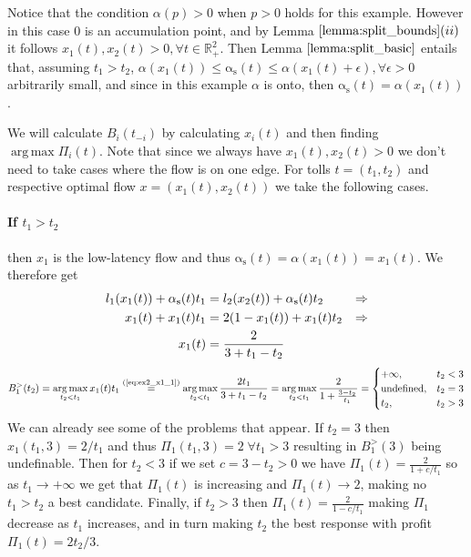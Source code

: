 \documentclass[10pt,a4paper]{book}
\newcommand{\indeq}[1]{\stackrel{\text{#1}}{=}}
\newcommand{\as}{\mathrm{\alpha_s}}
\newcommand{\R}{\mathbb{R}}
\DeclareMathOperator*{\argmax}{arg\,max}
\theoremstyle{definition}
\theoremstyle{comment}
\begin{document}
Notice that the condition $\alpha(p) > 0$ when $p > 0$ holds for this example.
However in this case $0$ is an accumulation point, and by Lemma $\ref{lemma:split_bounds}(ii)$ it follows $x_1(t), x_2(t) > 0, \forall t \in \R_+^2$.
Then Lemma $\ref{lemma:split_basic}$ entails that, assuming $t_1 > t_2$, $\alpha(x_1(t)) \le \as(t) \le \alpha(x_1(t) + \epsilon), \forall \epsilon > 0$ arbitrarily small, and since in this example $\alpha$ is onto, then $\as(t) = \alpha(x_1(t))$.

We will calculate $B_i(t_{-i})$ by calculating $x_i(t)$ and then finding $\argmax \Pi_i(t)$.
Note that since we always have $x_1(t), x_2(t) > 0$ we don't need to take cases where the flow is on one edge.
For tolls $t = (t_1, t_2)$ and respective optimal flow $x = (x_1(t), x_2(t))$ we take the following cases.

\paragraph{If $t_1 > t_2$}
then $x_1$ is the low-latency flow and thus $\as(t) = \alpha(x_1(t)) = x_1(t)$.
We therefore get
\begin{align}
	l_1(x_1(t)) + \as(t) t_1 &= l_2(x_2(t)) + \as(t) t_2 &\Rightarrow \notag \\
	x_1(t) + x_1(t) t_1 &= 2 (1 - x_1(t)) + x_1(t) t_2 &\Rightarrow \notag \\
	x_1(t) &= \frac{2}{3 + t_1 - t_2} \label{eq:ex2_x1_1}
\end{align}
\[
	B_1^>(t_2) = \argmax_{t_2 < t_1} x_1(t) t_1 \indeq{(\ref{eq:ex2_x1_1})} \argmax_{t_2 < t_1} \frac{2 t_1}{3 + t_1 - t_2} = \argmax_{t_2 < t_1} \frac{2}{1 + \frac{3 - t_2}{t_1}} =
		\begin{cases}
			+\infty, & t_2 < 3 \\
			\textrm{undefined}, & t_2 = 3 \\
			t_2, & t_2 > 3 \\
		\end{cases}
\]
We can already see some of the problems that appear.
If $t_2 = 3$ then $x_1(t_1, 3) = 2/t_1$ and thus $\Pi_1(t_1, 3) = 2 \; \forall t_1 > 3$ resulting in $B_1^>(3)$ being undefinable.
Then for $t_2 < 3$ if we set $c = 3 - t_2 > 0$ we have $\Pi_1(t) = \frac{2}{1 + c/t_1}$ so as $t_1 \rightarrow +\infty$ we get that $\Pi_1(t)$ is increasing and $\Pi_1(t) \rightarrow 2$, making no $t_1 > t_2$ a best candidate.
Finally, if $t_2 > 3$ then $\Pi_1(t) = \frac{2}{1 - c/t_1}$ making $\Pi_1$ decrease as $t_1$ increases, and in turn making $t_2$ the best response with profit $\Pi_1(t) = {2 t_2}/3$.
\end{document}
